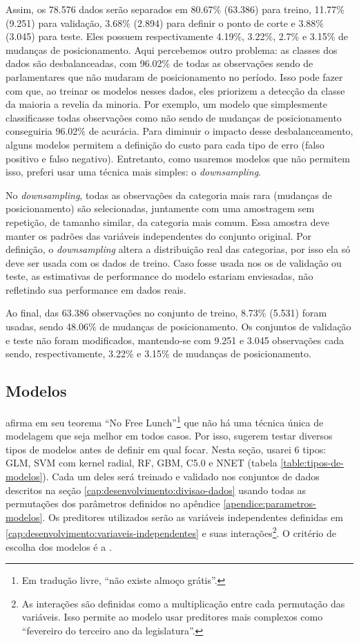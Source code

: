 \documentclass[a4paper,titlepage]{ppgi}\usepackage[]{graphicx}\usepackage[]{color}
\begin{document}
Assim, os 78.576 dados serão separados em
80.67\%
(63.386) para treino,
11.77\%
(9.251) para validação,
3.68\%
(2.894) para definir o ponto de corte e
3.88\% (3.045) para
teste. Eles possuem respectivamente
4.19\%,
3.22\%,
2.7\% e
3.15\% de mudanças de posicionamento.
Aqui percebemos outro problema: as classes dos dados são desbalanceadas, com
96.02\% de todas as observações sendo de
parlamentares que não mudaram de posicionamento no período. Isso pode fazer com
que, ao treinar os modelos nesses dados, eles priorizem a detecção da classe da
maioria a revelia da minoria. Por exemplo, um modelo que simplesmente
classificasse todas observações como não sendo de mudanças de posicionamento
conseguiria 96.02\% de acurácia.  Para
diminuir o impacto desse desbalanceamento, alguns modelos permitem a definição
do custo para cada tipo de erro (falso positivo e falso negativo). Entretanto,
como usaremos modelos que não permitem isso, preferi usar uma técnica mais
simples: o \emph{downsampling}.

No \emph{downsampling}, todas as observações da categoria mais rara (mudanças de
posicionamento) são selecionadas, juntamente com uma amostragem sem repetição,
de tamanho similar, da categoria mais comum. Essa amostra deve manter os padrões
das variáveis independentes do conjunto original. Por definição, o
\emph{downsampling} altera a distribuição real das categorias, por isso ela só
deve ser usada com os dados de treino. Caso fosse usada nos os de validação ou
teste, as estimativas de performance do modelo estariam enviesadas, não
refletindo sua performance em dados reais.

Ao final, das 63.386 observações no conjunto de
treino, 8.73\% (5.531) foram usadas,
sendo 48.06\% de mudanças
de posicionamento. Os conjuntos de validação e teste não foram modificados,
mantendo-se com 9.251 e 3.045 observações
cada sendo, respectivamente,
3.22\% e
3.15\% de mudanças de posicionamento.

\subsection{Modelos}



 afirma em seu teorema ``No Free Lunch''\footnote{Em
tradução livre, ``não existe almoço grátis''.} que não há uma técnica única de
modelagem que seja melhor em todos casos. Por isso, 
sugerem testar diversos tipos de modelos antes de definir em qual focar. Nesta
seção, usarei 6 tipos: \gls{GLM}, SVM com kernel
radial, \gls{RF}, \gls{GBM}, C5.0 e \gls{NNET} (tabela
\ref{table:tipos-de-modelos}). Cada um deles será treinado e validado nos
conjuntos de dados descritos na seção \ref{cap:desenvolvimento:divisao-dados} usando todas
as permutações dos parâmetros definidos no apêndice
\ref{apendice:parametros-modelos}. Os preditores utilizados serão as variáveis
independentes definidas em \ref{cap:desenvolvimento:variaveis-independentes} e suas
interações\footnote{As interações são definidas como a multiplicação entre cada
permutação das variáveis. Isso permite ao modelo usar preditores mais complexos
como ``fevereiro do terceiro ano da legislatura''.}. O critério de escolha dos
modelos é a .
\end{document}
